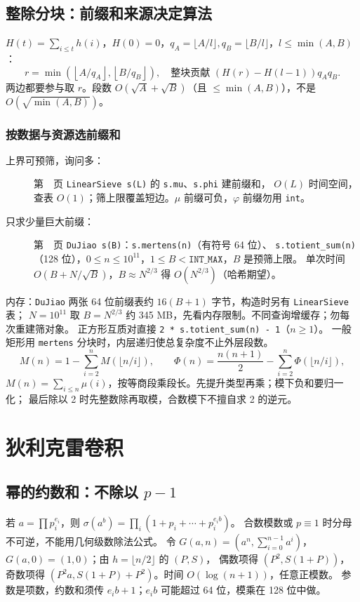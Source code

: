 \subsection{整除分块：前缀和来源决定算法}\label{knowledge-quotient-choice}
$H(t)=\sum_{i\le t}h(i)$，$H(0)=0$，$q_A=\lfloor A/l\rfloor,q_B=\lfloor B/l\rfloor$，$l\le\min(A,B)$：
\[
r=\min\!\left(\left\lfloor A/q_A\right\rfloor,
                 \left\lfloor B/q_B\right\rfloor\right),
\quad\text{整块贡献 }(H(r)-H(l-1))q_Aq_B.
\]
两边都要参与取 $r$。段数 $O(\sqrt A+\sqrt B)$（且 $\le\min(A,B)$），不是 $O(\sqrt{\min(A,B)})$。

\subsubsection{按数据与资源选前缀和}
\begin{description}
\item[上界可预筛，询问多：]
第~\pageref{compact-LinearSieve}~页 \texttt{LinearSieve s(L)} 的 \texttt{s.mu}、\texttt{s.phi} 建前缀和，
$O(L)$ 时间空间，查表 $O(1)$；筛上限覆盖短边。$\mu$ 前缀可负，$\varphi$ 前缀勿用 \texttt{int}。
\item[只求少量巨大前缀：]
第~\pageref{compact-DuJiao}~页 \texttt{DuJiao s(B)}：\texttt{s.mertens(n)}（有符号 64 位）、
\texttt{s.totient\_sum(n)}（128 位），$0\le n\le10^{11}$，$1\le B<\texttt{INT\_MAX}$，$B$ 是预筛上限。
单次时间 $O(B+N/\sqrt B)$，$B\approx N^{2/3}$ 得 $O(N^{2/3})$（哈希期望）。
\end{description}
内存：\texttt{DuJiao} 两张 64 位前缀表约 $16(B+1)$ 字节，构造时另有 \texttt{LinearSieve} 表；
$N=10^{11}$ 取 $B=N^{2/3}$ 约 345 MB，先看内存限制。不同查询增缓存；勿每次重建筛对象。
正方形互质对直接 \texttt{2 * s.totient\_sum(n) - 1}（$n\ge1$）。
一般矩形用 \texttt{mertens} 分块时，内层递归使总复杂度不止外层段数。
\[
M(n)=1-\sum_{i=2}^{n}M(\lfloor n/i\rfloor),\qquad
\Phi(n)=\frac{n(n+1)}2-\sum_{i=2}^{n}\Phi(\lfloor n/i\rfloor),
\]
$M(n)=\sum_{i\le n}\mu(i)$，按等商段乘段长。先提升类型再乘；模下负和要归一化；
最后除以 2 时先整数除再取模，合数模下不擅自求 2 的逆元。


\Needspace{180pt}

\section{狄利克雷卷积}

\subsection{幂的约数和：不除以 \texorpdfstring{$p-1$}{p-1}}\label{knowledge-divisor-power-sum}
若 $a=\prod p_i^{e_i}$，则 $\sigma(a^b)=\prod_i(1+p_i+\cdots+p_i^{e_i b})$。
合数模数或 $p\equiv1$ 时分母不可逆，不能用几何级数除法公式。
令 $G(a,n)=(a^n,\sum_{i=0}^{n-1}a^i)$，$G(a,0)=(1,0)$；由 $h=\lfloor n/2\rfloor$ 的 $(P,S)$，
偶数项得 $(P^2,S(1+P))$，奇数项得 $(P^2a,S(1+P)+P^2)$。时间 $O(\log(n+1))$，任意正模数。
参数是项数，约数和须传 $e_ib+1$；$e_ib$ 可能超过 64 位，模乘在 128 位中做。



